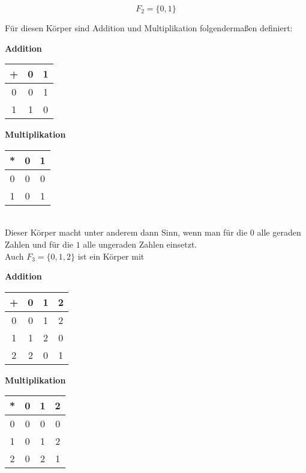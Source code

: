 \documentclass{article}
\begin{document}
\[
  F_2 = \{ 0, 1 \}
\]

Für diesen Körper sind Addition und Multiplikation folgendermaßen definiert: \\

\begin{minipage}{.45\textwidth}
  \textbf{Addition} \\
  
  \begin{tabular}{ c | c c }
    + & 0 & 1 \\
    \hline
    0 & 0 & 1 \\
    1 & 1 & 0 \\
  \end{tabular}
\end{minipage}
\hfill
\vrule
\hfill
\begin{minipage}{.45\textwidth}
  \textbf{Multiplikation} \\
  
  \begin{tabular}{ c | c c }
    * & 0 & 1 \\
    \hline
    0 & 0 & 0 \\
    1 & 0 & 1 \\
  \end{tabular}
\end{minipage}
\\

Dieser Körper macht unter anderem dann Sinn, wenn man für die $0$ alle geraden Zahlen und für die $1$
alle ungeraden Zahlen einsetzt. \\

Auch $F_3 = \{ 0, 1, 2 \}$ ist ein Körper mit \\

\begin{minipage}{.45\textwidth}
  \textbf{Addition} \\
  
  \begin{tabular}{ c | c c c }
    + & 0 & 1 & 2 \\
    \hline
    0 & 0 & 1 & 2 \\
    1 & 1 & 2 & 0 \\
    2 & 2 & 0 & 1 \\
  \end{tabular}
\end{minipage}
\hfill
\vrule
\hfill
\begin{minipage}{.45\textwidth}
  \textbf{Multiplikation} \\
  
  \begin{tabular}{ c | c c c}
    * & 0 & 1 & 2 \\
    \hline
    0 & 0 & 0 & 0 \\
    1 & 0 & 1 & 2 \\
    2 & 0 & 2 & 1 \\
  \end{tabular}
\end{minipage}
\\
\end{document}
